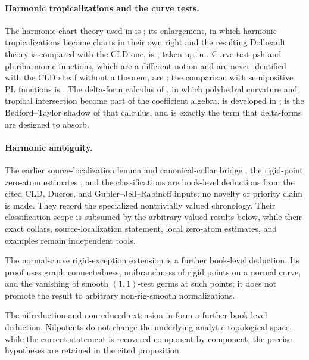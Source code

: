 \paragraph{Harmonic tropicalizations and the curve tests.}
The harmonic-chart theory used in
 is \cite[\S7.8]{CLD25}; its enlargement, in
which harmonic tropicalizations become charts in their own right and the
resulting Dolbeault theory is compared with the CLD one, is
\cite{GJR26}, taken up in .  Curve-test psh and
pluriharmonic functions, which are a different notion and are never
identified with the CLD sheaf without a theorem, are
\cite{GR25Classical,GR25PL}; the comparison with semipositive PL functions
is .  The delta-form calculus of
\cite{GK17,GK19}, in which polyhedral curvature and tropical intersection
become part of the coefficient algebra, is developed in
;  is the
Bedford--Taylor shadow of that calculus, and
 is exactly the term that delta-forms are
designed to absorb.

\paragraph{Harmonic ambiguity.}
The earlier source-localization lemma and canonical-collar bridge
, the rigid-point zero-atom estimates
, and the classifications
 are
book-level deductions from the cited CLD, Ducros, and
Gubler--Jell--Rabinoff inputs; no novelty or priority claim is made.  They
record the specialized nontrivially valued chronology.  Their classification
scope is subsumed by the arbitrary-valued results below, while their exact
collars, source-localization statement, local zero-atom estimates, and
examples remain independent tools.

The normal-curve rigid-exception extension
 is a further book-level
deduction.  Its proof uses graph connectedness, unibranchness of rigid
points on a normal curve, and the vanishing of smooth $(1,1)$-test germs at
such points; it does not promote the result to arbitrary non-rig-smooth
normalizations.

The nilreduction and nonreduced extension in
 form a further book-level
deduction.  Nilpotents do not change the underlying analytic topological
space, while the current statement is recovered component by component;
the precise hypotheses are retained in the cited proposition.

